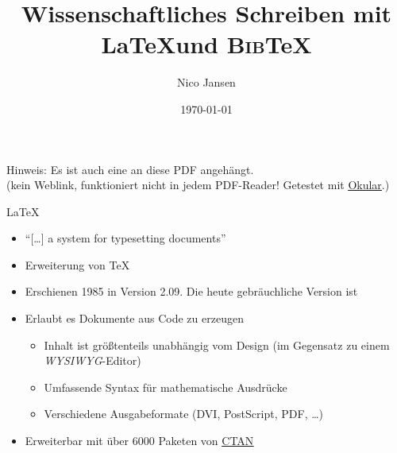 \documentclass[aspectratio=169]{beamer}
\title{Wissenschaftliches Schreiben mit \LaTeX und \textsc{Bib}\TeX}
\author{Nico Jansen}
\date{\today}
\newif\iflightmode
\providecommand{\tightlist}{\setlength{\itemsep}{0pt}\setlength{\parskip}{0pt}}
\newcommand\citestyle[1]{\textcolor{foreground-secondary}{\textsuperscript{#1}}}
\let\oldautocite\autocite
\renewcommand{\autocite}[1]{\citestyle{\oldautocite{#1}}}
\begin{document}
        \begin{frame}
            \maketitle
            \iflightmode
            \else
                \textcolor{foreground-secondary}{
                    Hinweis: Es ist auch eine 
                    an diese PDF angehängt. \\
                    (kein Weblink, funktioniert nicht in jedem PDF-Reader! Getestet mit \href{https://okular.kde.org)}{\alert{\underline{Okular}}}.)
                }
            \fi
        \end{frame}

    
        
    \begin{frame}{\LaTeX}
    \protect\hypertarget{section}{}
    \begin{itemize}
    \tightlist
    \item
      \enquote{[\ldots] a system for typesetting documents}\autocite{latex}
    \item
      Erweiterung von \TeX\autocite{latex}
    \item
      Erschienen 1985 in Version 2.09. Die heute gebräuchliche Version
      ist \autocite{latex}
    \item
      Erlaubt es Dokumente aus Code zu erzeugen\autocite{latex}

      \begin{itemize}
      \tightlist
      \item
        Inhalt ist größtenteils unabhängig vom Design (im Gegensatz zu
        einem \emph{WYSIWYG}-Editor)\autocite{latex}
      \item
        Umfassende Syntax für mathematische Ausdrücke\autocite{latex}
      \item
        Verschiedene Ausgabeformate (DVI\autocite{latex},
        PostScript\autocite{ctan-dvips}, PDF\autocite{ctan-dvipdfmx},
        \ldots)
      \end{itemize}
    \item
      Erweiterbar mit über 6000 Paketen von
      \href{https://ctan.org}{\alert{\underline{CTAN}}}\autocite{ctan}
    \end{itemize}
    \end{frame}
\end{document}
